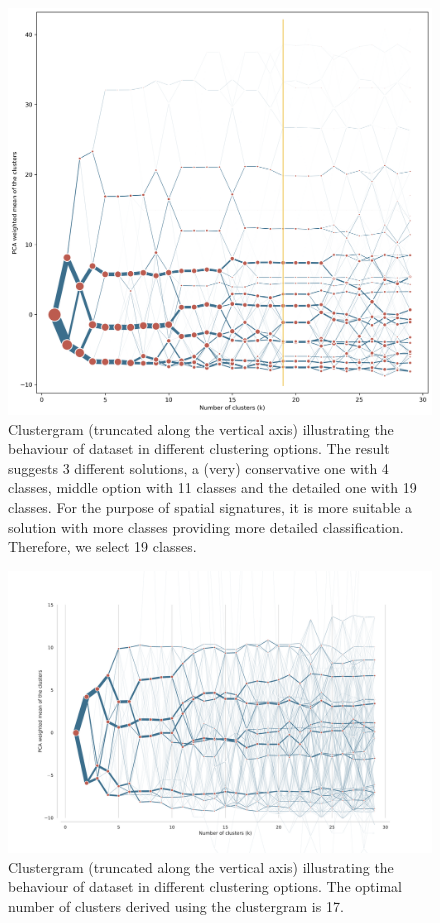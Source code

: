 \begin{figure}
    \includegraphics[width=\linewidth]{figures/clustergram_med.png}
    \caption{Clustergram (truncated along the vertical axis) illustrating the behaviour
    of dataset in different clustering options. The result suggests 3 different
    solutions, a (very) conservative one with 4 classes, middle option with 11 classes
    and the detailed one with 19 classes. For the purpose of spatial signatures, it is
    more suitable a solution with more classes providing more detailed classification.
    Therefore, we select 19 classes.
    }
    \label{fig:cgram_med}
\end{figure}

\begin{figure}
    \includegraphics[width=\linewidth]{figures/clustergram_des.pdf}
    \caption{Clustergram (truncated along the vertical axis) illustrating the behaviour of dataset in different clustering options. The optimal number of clusters derived using the clustergram is 17.}
    \label{fig:cgram_des}
\end{figure}

